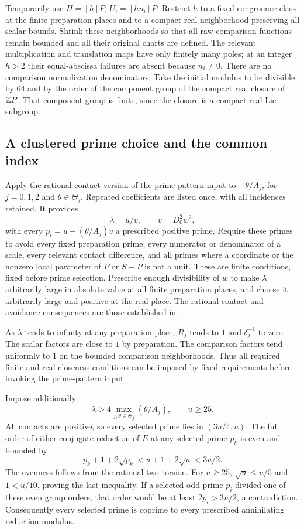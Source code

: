 \documentclass[11pt,a4paper]{article}
\begin{document}
Temporarily use $H=[h]P$, $U_i=[hn_i]P$. Restrict $h$ to a
fixed congruence class at the finite preparation places and to a
compact real neighborhood preserving all scalar bounds. Shrink
these neighborhoods so that all raw comparison functions remain
bounded and all their original charts are defined. The relevant
multiplication and translation maps have only finitely many poles;
at an integer $h>2$ their equal-abscissa failures are absent because
$n_i\ne0$. There are no comparison normalization denominators.
Take the initial modulus to be divisible by $64$ and by the order
of the component group of the compact real closure of $\mathbb Z P$.
That component group is finite, since the closure is a compact
real Lie subgroup.

\subsection{A clustered prime choice and the common index}

Apply the rational-contact version of the prime-pattern input to
$-\theta/A_j$, for $j=0,1,2$ and $\theta\in\Theta_j$.
Repeated coefficients are listed once, with all incidences retained.
It provides
\[
                         \lambda=u/v,\qquad v=D_0^2w^2,
\]
with every
$p_i=u-(\theta/A_j)v$ a prescribed positive prime. Require these
primes to avoid every fixed preparation prime, every numerator or
denominator of a scale, every relevant contact difference, and
all primes where a coordinate or the nonzero local parameter of
$P$ or $S-P$ is not a unit. These are finite conditions, fixed
before prime selection. Prescribe enough divisibility of $w$ to
make $\lambda$ arbitrarily large in absolute value at all finite
preparation places, and choose it arbitrarily large and positive
at the real place. The rational-contact and avoidance consequences
are those established in~\cite{Dependencies}.

As $\lambda$ tends to infinity at any preparation place, $R_j$
tends to $1$ and $\delta_j^{-1}$ to zero. The scalar factors
are close to $1$ by preparation. The comparison factors tend
uniformly to $1$ on the bounded comparison neighborhoods. Thus
all required finite and real closeness conditions can be imposed
by fixed requirements before invoking the prime-pattern input.

Impose additionally
\begin{equation}\label{eq:cluster}
 \lambda>4\max_{j,\theta\in\Theta_j}(\theta/A_j),\qquad u\ge25.
\end{equation}
All contacts are positive, so every selected prime lies in
$(3u/4,u)$. The full order of either conjugate reduction of $E$
at any selected prime $p_k$ is even and bounded by
\[
 p_k+1+2\sqrt{p_k}<u+1+2\sqrt u<3u/2.
\]
The evenness follows from the rational two-torsion. For $u\ge25$,
$\sqrt u\le u/5$ and $1<u/10$, proving the last inequality.
If a selected odd prime $p_i$ divided one of these even group
orders, that order would be at least $2p_i>3u/2$, a contradiction.
Consequently every selected prime is coprime to every prescribed
annihilating reduction modulus.
\end{document}
